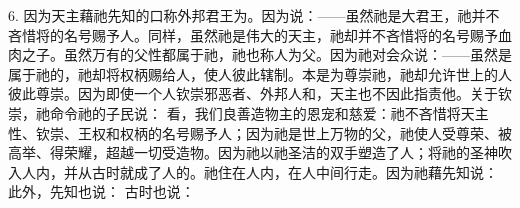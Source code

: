 6. 因为天主藉祂先知的口称外邦君王为。因为说：——虽然祂是大君王，祂并不吝惜将的名号赐予人。同样，虽然祂是伟大的天主，祂却并不吝惜将的名号赐予血肉之子。虽然万有的父性都属于祂，祂也称人为父。因为祂对会众说：——虽然是属于祂的，祂却将权柄赐给人，使人彼此辖制。本是为尊崇祂，祂却允许世上的人彼此尊崇。因为即使一个人钦崇邪恶者、外邦人和，天主也不因此指责他。关于钦崇，祂命令祂的子民说：  看，我们良善造物主的恩宠和慈爱：祂不吝惜将天主性、钦崇、王权和权柄的名号赐予人；因为祂是世上万物的父，祂使人受尊荣、被高举、得荣耀，超越一切受造物。因为祂以祂圣洁的双手塑造了人；将祂的圣神吹入人内，并从古时就成了人的。祂住在人内，在人中间行走。因为祂藉先知说：  此外，先知也说：  古时也说：\par

